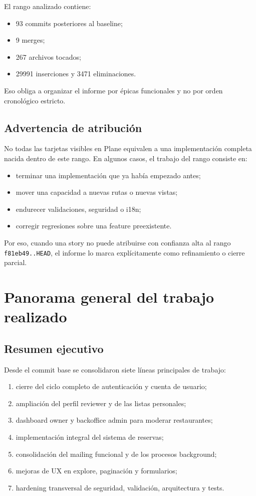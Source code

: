 \documentclass[11pt,a4paper]{report}
\newcommand{\commit}[1]{\texttt{#1}}
\begin{document}
El rango analizado contiene:

\begin{itemize}
  \item 93 commits posteriores al baseline;
  \item 9 merges;
  \item 267 archivos tocados;
  \item 29991 inserciones y 3471 eliminaciones.
\end{itemize}

Eso obliga a organizar el informe por \'epicas funcionales y no por orden cronol\'ogico estricto.

\section{Advertencia de atribuci\'on}

No todas las tarjetas visibles en Plane equivalen a una implementaci\'on completa nacida dentro de este rango. En algunos casos, el trabajo del rango consiste en:

\begin{itemize}
  \item terminar una implementaci\'on que ya hab\'ia empezado antes;
  \item mover una capacidad a nuevas rutas o nuevas vistas;
  \item endurecer validaciones, seguridad o i18n;
  \item corregir regresiones sobre una feature preexistente.
\end{itemize}

Por eso, cuando una story no puede atribuirse con confianza alta al rango \commit{f81eb49..HEAD}, el informe lo marca expl\'icitamente como refinamiento o cierre parcial.

\chapter{Panorama general del trabajo realizado}

\section{Resumen ejecutivo}

Desde el commit base se consolidaron siete l\'ineas principales de trabajo:

\begin{enumerate}
  \item cierre del ciclo completo de autenticaci\'on y cuenta de usuario;
  \item ampliaci\'on del perfil reviewer y de las listas personales;
  \item dashboard owner y backoffice admin para moderar restaurantes;
  \item implementaci\'on integral del sistema de reservas;
  \item consolidaci\'on del mailing funcional y de los procesos background;
  \item mejoras de UX en explore, paginaci\'on y formularios;
  \item hardening transversal de seguridad, validaci\'on, arquitectura y tests.
\end{enumerate}
\end{document}
